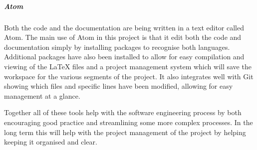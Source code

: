 \documentclass[a4paper]{article}
\begin{document}
\subparagraph{Atom}
Both the code and the documentation are being written in a text editor called Atom.
The main use of Atom in this project is that it edit both the code and documentation simply by installing packages to recognise both languages.
Additional packages have also been installed to allow for easy compilation and viewing of the LaTeX files and a project management system which will save the workspace for the various segments of the project.
It also integrates well with Git showing which files and specific lines have been modified, allowing for easy management at a glance.
\\ \par
Together all of these tools help with the software engineering process by both encouraging good practice and streamlining some more complex processes.
In the long term this will help with the project management of the project by helping keeping it organised and clear.
\end{document}
